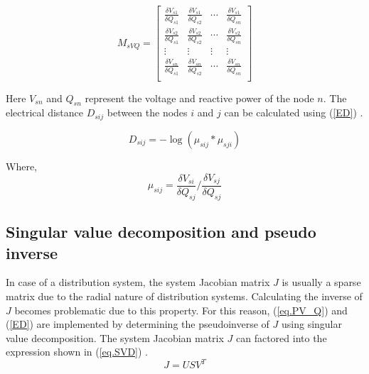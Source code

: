 \begin{equation}\label{MsVq_expan}
M_{sVQ} =
\begin{bmatrix}
\frac{\delta V_{s1}}{\delta Q_{s1}}  & \frac{\delta V_{s1}}{\delta Q_{s2}} & \cdots & \frac{\delta V_{s1}}{\delta Q_{sn}}\\

\frac{\delta V_{s2}}{\delta Q_{s1}}  & \frac{\delta V_{s2}}{\delta Q_{s2}} & \cdots & \frac{\delta V_{s2}}{\delta Q_{sn}}\\

\vdots & \vdots & \vdots & \vdots\\

\frac{\delta V_{sn}}{\delta Q_{s1}}  & \frac{\delta V_{sn}}{\delta Q_{s2}} & \cdots & \frac{\delta V_{sn}}{\delta Q_{sn}}\\ 
\end{bmatrix}
\end{equation}
 
Here $V_{sn}$ and $Q_{sn}$ represent the voltage and reactive power of the node $n$. The electrical distance $D_{sij}$ between the nodes $i$ and $j$ can be calculated using (\ref{ED}) \cite{int1}. 

\begin{equation}\label{ED}
D_{sij} = -\log (\mu_{sij} * \mu_{sji})
\end{equation}

Where,
\begin{equation}
\mu_{sij} =  \frac{\delta V_{si}}{\delta Q_{sj}} / \frac{\delta V_{sj}}{\delta Q_{sj}}
\end{equation}


\subsection{Singular value decomposition and pseudo inverse}

In case of a distribution system, the system Jacobian matrix $J$ is usually a sparse matrix due to the radial nature of distribution systems. Calculating the inverse of $J$ becomes problematic due to this property. For this reason, (\ref{eq.PV_Q}) and (\ref{ED}) are implemented by determining the pseudoinverse of $J$ using singular value decomposition. The system Jacobian matrix $J$ can factored into the expression shown in (\ref{eq.SVD}) \cite{PINV}.
\begin{equation}\label{eq.SVD}
    J = USV^T
\end{equation}

